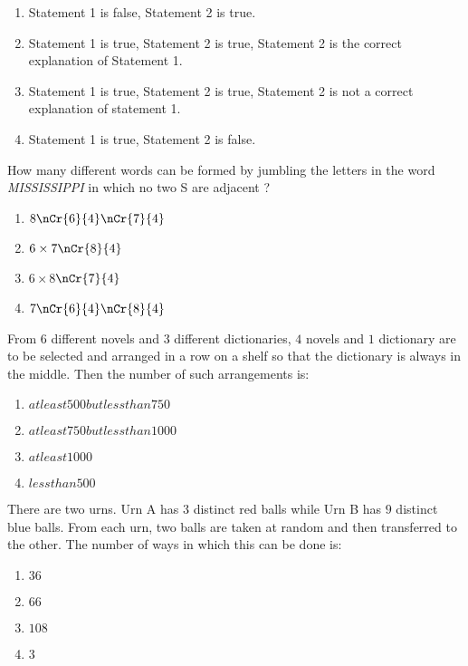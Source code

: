  \begin{enumerate}
     \item Statement 1 is false, Statement 2 is true.
     \item Statement 1 is true, Statement 2 is true, Statement 2 is the correct explanation of Statement 1.
     \item Statement 1 is true, Statement 2 is true, Statement 2 is not a correct explanation of statement 1.
     \item Statement 1 is true, Statement 2 is false.
 \end{enumerate}
\item  How many different words can be formed by jumbling the letters in the word \emph{MISSISSIPPI} in which no two S are adjacent ?
	\begin{multicols}{2}
	\begin{enumerate}
		\item $8 \nCr{6}{4} \nCr {7}{4}$
		\item $6\times7 \nCr{8}{4}$
		\item $6\times8$$\nCr{7}{4}$
		\item $ 7 \nCr{6}{4} \nCr {8}{4}$
        \end{enumerate}
	\end{multicols}
\item From $6$ different novels and $3$ different dictionaries, $4$ novels and $1$ dictionary are to be selected and arranged in a row on a shelf so that the dictionary is always in the middle. Then the number of such arrangements is: \hfill{}
 \begin{enumerate}
     \item $at least 500 but less than 750$
     \item $at least 750 but less than 1000$
     \item $at least 1000$
     \item $less than 500$
 \end{enumerate}
\item There are two urns. Urn A has $3$ distinct red balls while Urn B has $9$ distinct blue balls. From each urn, two balls are taken at random and then transferred to the other. The number of ways in which this can be done is: \hfill{}
	\begin{multicols}{4}
	\begin{enumerate}
     \item $36$
     \item $66$
     \item $108$
     \item $3$
        \end{enumerate}
	\end{multicols}
